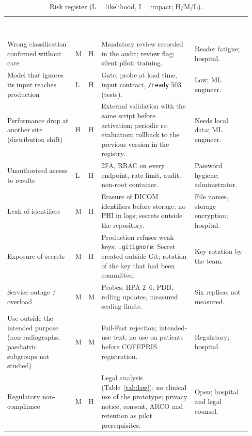 \documentclass[12pt,a4paper]{article}
\newcommand{\hd}[1]{\textcolor{white}{\textbf{#1}}}
\begin{document}
\begin{table}[H]
\centering
\caption{Risk register (L = likelihood, I = impact; H/M/L).}
\label{tab:risks}
\renewcommand{\arraystretch}{1.2}
\footnotesize
\begin{tabularx}{\textwidth}{L{3.1cm} C{0.6cm} C{0.6cm} Y L{3.0cm}}
\hd{Risk} & \hd{L} & \hd{I} & \hd{Mitigation} & \hd{Residual / owner} \\
Wrong classification confirmed without care & M & H & Mandatory review recorded in the audit; review flag; silent pilot; training. & Reader fatigue; hospital. \\
Model that ignores its input reaches production & L & H & Gate, probe at load time, input contract, \texttt{/ready} 503 (tests). & Low; ML engineer. \\
Performance drop at another site (distribution shift) & H & H & External validation with the same script before activation; periodic re-evaluation; rollback to the previous version in the registry. & Needs local data; ML engineer. \\
Unauthorised access to results & L & H & 2FA, RBAC on every endpoint, rate limit, audit, non-root container. & Password hygiene; administrator. \\
Leak of identifiers & M & H & Erasure of DICOM identifiers before storage; no PHI in logs; secrets outside the repository. & File names, storage encryption; hospital. \\
Exposure of secrets & M & H & Production refuses weak keys; \texttt{.gitignore}; Secret created outside Git; rotation of the key that had been committed. & Key rotation by the team. \\
Service outage / overload & M & M & Probes, HPA 2--6, PDB, rolling updates, measured scaling limits. & Six replicas not measured. \\
Use outside the intended purpose (non-radiographs, paediatric subgroups not studied) & M & M & Fail-Fast rejection; intended-use text; no use on patients before COFEPRIS registration. & Regulatory; hospital. \\
Regulatory non-compliance & M & H & Legal analysis (Table~\ref{tab:law}); no clinical use of the prototype; privacy notice, consent, ARCO and retention as pilot prerequisites. & Open; hospital and legal counsel. \\
\end{tabularx}
\end{table}
\end{document}
